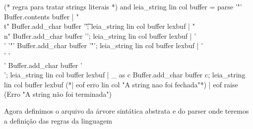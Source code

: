 \documentclass[12pt,a4paper,twoside]{report}
\begin{document}
\begin{terminal}
(* regra para tratar strings literais *)
and leia_string lin col buffer = parse
  '"'       { Buffer.contents buffer}
| "\\t"     { Buffer.add_char buffer '\t'; leia_string lin col buffer lexbuf }
| "\\n"     { Buffer.add_char buffer '\n'; leia_string lin col buffer lexbuf }
| '\\' '"'  { Buffer.add_char buffer '"'; leia_string lin col buffer lexbuf }
| '\\' '\\' { Buffer.add_char buffer '\\'; leia_string lin col buffer lexbuf }
| _ as c    { Buffer.add_char buffer c; leia_string lin col buffer lexbuf }
(*| eof       { erro lin col "A string nao foi fechada"}*)
| eof       { raise (Erro "A string não foi terminada") }	
\end{terminal}
Agora definimos o arquivo da árvore sintática abstrata e do parser onde teremos a definição das regras da linguagem
\end{document}
